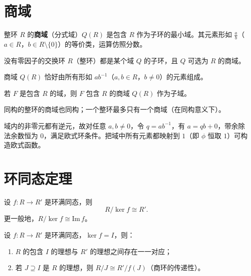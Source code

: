\section{商域}

\begin{definition}[商域]
整环 $R$ 的\textbf{商域}（分式域）$Q(R)$ 是包含 $R$ 作为子环的最小域。其元素形如 $\frac{a}{b}$（$a \in R$，$b \in R \setminus \{0\}$）的等价类，运算仿照分数。
\end{definition}

\begin{theorem}[定理 1：整环嵌入商域]
没有零因子的交换环 $R$（整环）都是某个域 $Q$ 的子环，且 $Q$ 可选为 $R$ 的商域。
\end{theorem}

\begin{theorem}[定理 2：商域的元素刻画]
商域 $Q(R)$ 恰好由所有形如 $ab^{-1}$（$a, b \in R$，$b \ne 0$）的元素组成。
\end{theorem}

\begin{theorem}[定理 3：商域的最小性]
若 $F$ 是包含 $R$ 的域，则 $F$ 包含 $R$ 的商域 $Q(R)$ 作为子域。
\end{theorem}

\begin{theorem}[定理 4：同构环的商域同构]
同构的整环的商域也同构；一个整环最多只有一个商域（在同构意义下）。
\end{theorem}

\begin{proposition}[域都是欧式环]
域内的非零元都有逆元，故对任意 $a, b \ne 0$，令 $q = ab^{-1}$，有 $a = qb + 0$，带余除法余数恒为 $0$，满足欧式环条件。把域中所有元素都映射到 $1$（即 $\phi$ 恒取 $1$）可构造欧式函数。
\end{proposition}

\section{环同态定理}

\begin{theorem}[第一同构定理（环版）]
设 $f \colon R \to R'$ 是环满同态，则
\[
  R / \ker f \cong R'.
\]
更一般地，$R / \ker f \cong \mathrm{Im}\, f$。
\end{theorem}

\begin{theorem}
设 $f \colon R \to R'$ 是环满同态，$\ker f = I$，则：
\begin{enumerate}
  \item $R$ 的包含 $I$ 的理想与 $R'$ 的理想之间存在一一对应；
  \item 若 $J \supseteq I$ 是 $R$ 的理想，则 $R/J \cong R'/f(J)$（商环的传递性）。
\end{enumerate}
\end{theorem}

